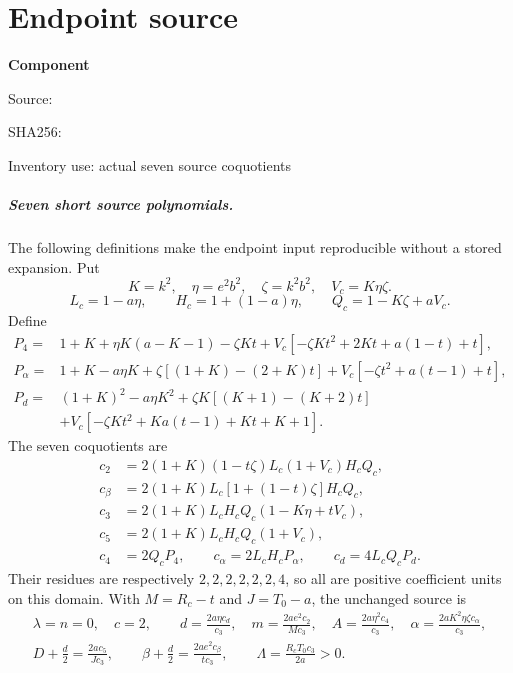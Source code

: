 \chapter{Endpoint source}
\label{component:p7d4e5164e84a}
\noindent\textbf{Component }\par
{\small\noindent Source: \par}
{\small\noindent SHA256: \par}
{\small\noindent Inventory use: actual seven source coquotients\par}
\medskip
\paragraph{Seven short source polynomials.}
The following definitions make the endpoint input reproducible without a stored expansion. Put
\[
K=k^2,\quad \eta=e^2b^2,\quad\zeta=k^2b^2,\quad V_c=K\eta\zeta.
\]
\[
L_c=1-a\eta,\qquad H_c=1+(1-a)\eta,\qquad Q_c=1-K\zeta+aV_c.
\]
Define
\begin{align*}
P_4={}&1+K+\eta K(a-K-1)-\zeta Kt
 +V_c[-\zeta Kt^2+2Kt+a(1-t)+t],\\
P_\alpha={}&1+K-a\eta K+\zeta[(1+K)-(2+K)t]
 +V_c[-\zeta t^2+a(t-1)+t],\\
P_d={}&(1+K)^2-a\eta K^2+\zeta K[(K+1)-(K+2)t]\\
&+V_c[-\zeta Kt^2+Ka(t-1)+Kt+K+1].
\end{align*}
The seven coquotients are
\begin{align*}
c_2&=2(1+K)(1-t\zeta)L_c(1+V_c)H_cQ_c,\\
c_\beta&=2(1+K)L_c[1+(1-t)\zeta]H_cQ_c,\\
c_3&=2(1+K)L_cH_cQ_c(1-K\eta+tV_c),\\
c_5&=2(1+K)L_cH_cQ_c(1+V_c),\\
c_4&=2Q_cP_4,\qquad c_\alpha=2L_cH_cP_\alpha,
\qquad c_d=4L_cQ_cP_d.
\end{align*}
Their residues are respectively $2,2,2,2,2,2,4$, so all are positive coefficient units on this domain. With $M=R_c-t$ and $J=T_0-a$, the unchanged source is
\begin{gather*}
\lambda=n=0,\quad c=2,\qquad
d=\frac{2a\eta c_d}{c_3},\quad m=\frac{2ae^2c_2}{Mc_3},\quad
A=\frac{2a\eta^2c_4}{c_3},\quad
\alpha=\frac{2aK^2\eta\zeta c_\alpha}{c_3},\\
D+\frac d2=\frac{2ac_5}{Jc_3},\qquad
\beta+\frac d2=\frac{2ae^2c_\beta}{tc_3},\qquad
\Lambda=\frac{R_cT_0c_3}{2a}>0.
\end{gather*}
